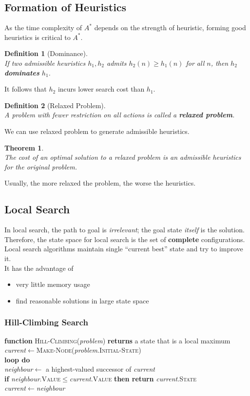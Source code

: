 \documentclass[12pt]{article}
\newcommand{\ind}{\hspace*{15pt}}
\newtheorem{definition}{Definition}[section]
\newtheorem{theorem}{Theorem}[section]
\theoremstyle{definition}
\begin{document}
\subsection{Formation of Heuristics}
As the time complexity of $A^\ast$ depends on the strength of heuristic, forming good heuristics is critical to $A^\ast$.\\
\begin{definition}[Dominance]
\hfill\\\normalfont If two admissible heuristics $h_1, h_2$ admits $h_2(n)\geq h_1(n)$ for all $n$, then $h_2$ \textbf{dominates} $h_1$.
\end{definition}
It follows that $h_2$ incurs lower search cost than $h_1$.\\
\begin{definition}[Relaxed Problem]
\hfill\\\normalfont A problem with fewer restriction on all actions is called a \textbf{relaxed problem}.
\end{definition}
We can use relaxed problem to generate admissible heuristics.
\begin{theorem}
\hfill\\\normalfont The cost of an optimal solution to a relaxed problem is an admissible heuristics for the original problem.
\end{theorem}
Usually, the more relaxed the problem, the worse the heuristics.
\subsection{Local Search}
In local search, the path to goal is \textit{irrelevant}; the goal state \textit{itself} is the solution.\\
Therefore, the state space for local search is the set of \textbf{complete} configurations.\\
Local search algorithms maintain single ``current best'' state and try to improve it.\\
It has the advantage of 
\begin{itemize}
	\item very little memory usage
	\item find reasonable solutions in large state space
\end{itemize}
\subsubsection{Hill-Climbing Search}
\textbf{function} \textsc{Hill-Climbing}(\textit{problem}) \textbf{returns} a state that is a local maximum\\
\ind \textit{current}$\leftarrow$\textsc{Make-Node}(\textit{problem}.\textsc{Initial-State})\\
\ind \textbf{loop do}\\
\ind \ind \textit{neighbour}$\leftarrow$ a highest-valued successor of \textit{current}\\
\ind \ind \textbf{if} \textit{neighbour}.\textsc{Value}$\leq$\textit{current}.\textsc{Value} \textbf{then return} \textit{current}.\textsc{State}\\
\ind \ind \textit{current}$\leftarrow$\textit{neighbour}\\
\end{document}
